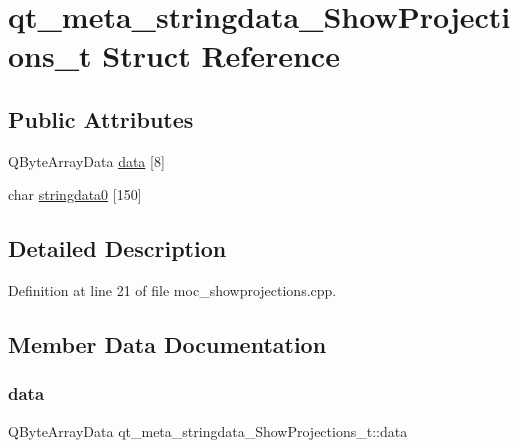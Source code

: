 \hypertarget{structqt__meta__stringdata___show_projections__t}{}\section{qt\+\_\+meta\+\_\+stringdata\+\_\+\+Show\+Projections\+\_\+t Struct Reference}
\label{structqt__meta__stringdata___show_projections__t}
\subsection*{Public Attributes}
\begin{DoxyCompactItemize}
\item 
Q\+Byte\+Array\+Data \mbox{\hyperlink{structqt__meta__stringdata___show_projections__t_a27d21fdcb4b53d31b8783ff501603c6d}{data}} \mbox{[}8\mbox{]}
\item 
char \mbox{\hyperlink{structqt__meta__stringdata___show_projections__t_a68cb16ddbcfc62fc21eac5777911529a}{stringdata0}} \mbox{[}150\mbox{]}
\end{DoxyCompactItemize}


\subsection{Detailed Description}


Definition at line 21 of file moc\+\_\+showprojections.\+cpp.



\subsection{Member Data Documentation}
\mbox{\label{structqt__meta__stringdata___show_projections__t_a27d21fdcb4b53d31b8783ff501603c6d}} 
\subsubsection{\texorpdfstring{data}{data}}
{\footnotesize\ttfamily Q\+Byte\+Array\+Data qt\+\_\+meta\+\_\+stringdata\+\_\+\+Show\+Projections\+\_\+t\+::data}



